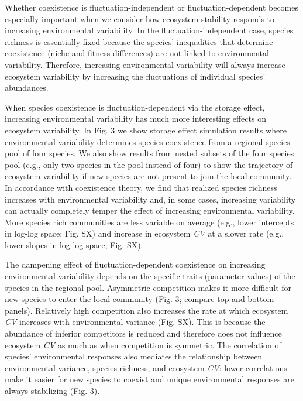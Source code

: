 \documentclass[12pt,]{article}
\begin{document}
Whether coexistence is fluctuation-independent or fluctuation-dependent
becomes especially important when we consider how ecosystem stability
responds to increasing environmental variability. In the
fluctuation-independent case, species richness is essentially fixed
because the species' inequalities that determine coexistence (niche and
fitness differences) are not linked to environmental variability.
Therefore, increasing environmental variability will always increase
ecosystem variability by increasing the fluctuations of individual
species' abundances.

When species coexistence is fluctuation-dependent via the storage
effect, increasing environmental variability has much more interesting
effects on ecosystem variability. In Fig. 3 we show storage effect
simulation results where environmental variability determines species
coexistence from a regional species pool of four species. We also show
results from nested subsets of the four species pool (e.g., only two
species in the pool instead of four) to show the trajectory of ecosystem
variability if new species are not present to join the local community.
In accordance with coexistence theory, we find that realized species
richness increases with environmental variability and, in some cases,
increasing variability can actually completely temper the effect of
increasing environmental variability. More species rich communities are
less variable on average (e.g., lower intercepts in log-log space; Fig.
SX) and increase in ecosystem \emph{CV} at a slower rate (e.g., lower
slopes in log-log space; Fig. SX).

The dampening effect of fluctuation-dependent coexistence on increasing
environmental variability depends on the specific traits (parameter
values) of the species in the regional pool. Asymmetric competition
makes it more difficult for new species to enter the local community
(Fig. 3; compare top and bottom panels). Relatively high competition
also increases the rate at which ecosystem \emph{CV} increases with
environmental variance (Fig. SX). This is because the abundance of
inferior competitors is reduced and therefore does not influence
ecosystem \emph{CV} as much as when competition is symmetric. The
correlation of species' environmental responses also mediates the
relationship between environmental variance, species richness, and
ecosystem \emph{CV}: lower correlations make it easier for new species
to coexist and unique environmental responses are always stabilizing
(Fig. 3).
\end{document}
